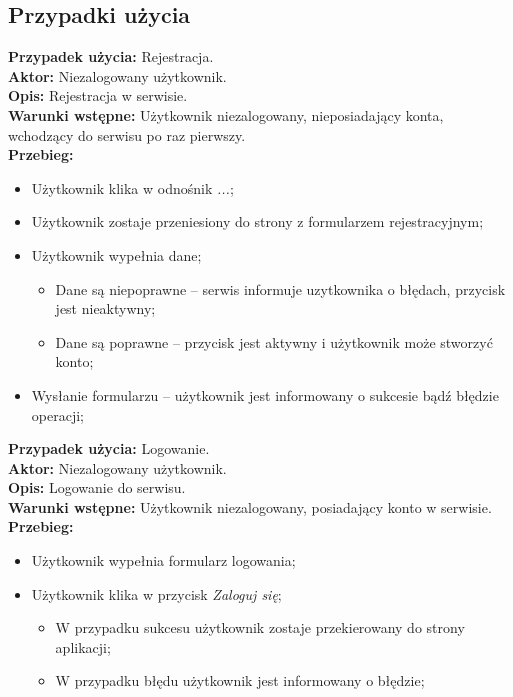 \subsection{Przypadki użycia}
\noindent
\textbf{Przypadek użycia:} Rejestracja. \\
\textbf{Aktor:} Niezalogowany użytkownik. \\
\textbf{Opis:} Rejestracja w serwisie. \\
\textbf{Warunki wstępne:} Użytkownik niezalogowany, nieposiadający konta, wchodzący do serwisu po raz pierwszy.\\
\textbf{Przebieg:}
\begin{itemize}[leftmargin=1cm]
    \item Użytkownik klika w odnośnik \textit{...};
    \item Użytkownik zostaje przeniesiony do strony z formularzem rejestracyjnym;
    \item  Użytkownik wypełnia dane;
    \begin{itemize}
        \item Dane są niepoprawne -- serwis informuje uzytkownika o błędach, przycisk jest nieaktywny;
        \item Dane są poprawne -- przycisk jest aktywny i użytkownik może stworzyć konto;
    \end{itemize}
    \item Wysłanie formularzu -- użytkownik jest informowany o sukcesie bądź błędzie operacji;
\end{itemize}

\textbf{Przypadek użycia:} Logowanie. \\
\textbf{Aktor:} Niezalogowany użytkownik. \\
\textbf{Opis:} Logowanie do serwisu. \\
\textbf{Warunki wstępne:} Użytkownik niezalogowany, posiadający konto w serwisie. \\
\textbf{Przebieg:}
\begin{itemize}[leftmargin=1cm]
    \item Użytkownik wypełnia formularz logowania;
    \item Użytkownik klika w przycisk \textit{Zaloguj się};
    \begin{itemize}
        \item W przypadku sukcesu użytkownik zostaje przekierowany do strony aplikacji;
        \item W przypadku błędu użytkownik jest informowany o błędzie;
    \end{itemize}
\end{itemize}

